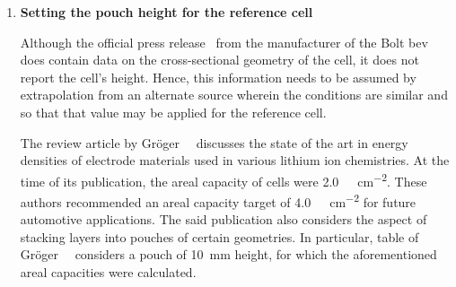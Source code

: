 \begin{enumerate}[ label=\textbf{\arabic*}), leftmargin=0pt, itemindent=20pt, labelwidth=15pt, labelsep=5pt, listparindent=0.7cm, align=left]
        The  task of  determining the  electrochemically active  overall surface
        area of the reference cell is now straightforward, and is obtained as
        \begin{align}
            \text{Overall surface area of reference cell}, A_\text{refcell} &= \frac{\text{Cell capacity (\si{\amphour})}}{\text{1C-rate density (\si{\ampere\per\meter\squared})}} \\
                                                                            &= \frac{60}{29.23} \\
                                                                            &= \SI{2.053}{\meter\squared}
        \end{align}
        This  value  is  listed  in  \cref{tbl:lcoSimParamsSPMp2d}  for  use  in
        ,  but  is  \emph{not}
        used directly in  this layer optimisation work. This is  because, as the
        number  of  layers change,  the  overall  surface  area changes  as  per
        \cref{eq:overallarea}. However,  determining this value is  an important
        initial step in the determination of the surface area per layer.

    \item \textbf{Setting the pouch height for the reference cell}

        Although  the   official  press   release~\cite{GMBoltBatteryDims}  from
        the  manufacturer  of  the  Bolt  \gls{bev} does  contain  data  on  the
        cross-sectional  geometry of  the cell,  it does  not report  the cell's
        height. Hence,  this information  needs to  be assumed  by extrapolation
        from an alternate source wherein the  conditions are similar and so that
        that value may be applied for the reference cell.

        The   review  article   by  Gr\"oger~\etal~\cite{Groger2015}   discusses
        the   state   of   the   art    in   energy   densities   of   electrode
        materials    used   in    various    lithium    ion   chemistries.    At
        the    time    of   its    publication,    the    areal   capacity    of
        cells  were   \approx  \SI{2.0}{\milli\amphour\per\centi\meter\squared}.
        These    authors   recommended    an    areal    capacity   target    of
        \SI{4.0}{\milli\amphour\per\centi\meter\squared}  for future  automotive
        applications. The said publication also considers the aspect of stacking
        layers  into  pouches  of   certain  geometries.  In  particular,  table
          of Gr\"oger~\etal~\cite{Groger2015}  considers a  pouch
        of  \SI{10}{\milli\meter} height,  for  which  the aforementioned  areal
        capacities were calculated.


\end{enumerate}
